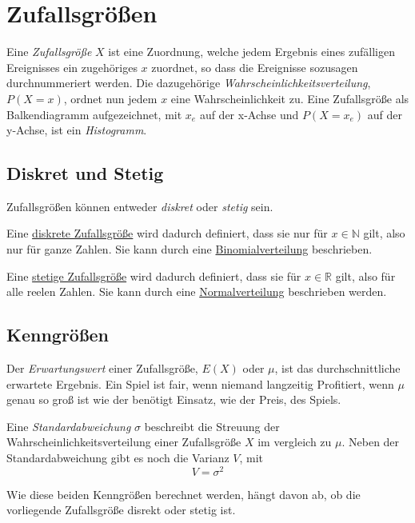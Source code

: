 \documentclass{article}
\begin{document}
\section{Zufallsgrößen} 
Eine \emph{Zufallsgröße} $X$ ist eine Zuordnung, welche jedem Ergebnis eines zufälligen Ereignisses ein zugehöriges $x$ zuordnet, so dass die Ereignisse sozusagen durchnummeriert werden. Die dazugehörige \emph{Wahrscheinlichkeitsverteilung}, $P(X=x)$, ordnet nun jedem $x$ eine Wahrscheinlichkeit zu. \newline
Eine Zufallsgröße als Balkendiagramm aufgezeichnet, mit $x_e$ auf der x-Achse und $P(X=x_e)$ auf der y-Achse, ist ein \emph{Histogramm}.
 
\subsection{Diskret und Stetig} 
Zufallsgrößen können entweder \emph{diskret} oder \emph{stetig} sein.
 
Eine \hyperref[Diskrete Zufallsgröße]{diskrete Zufallsgröße} wird dadurch definiert, dass sie nur für $x \in \mathbb{N}$ gilt, also nur für ganze Zahlen. Sie kann durch eine \hyperref[Binomialverteilungen]{Binomialverteilung} beschrieben. 
 
Eine \hyperref[Stetige Zufallsgröße]{stetige Zufallsgröße} wird dadurch definiert, dass sie für $x \in \mathbb{R}$ gilt, also für alle reelen Zahlen. Sie kann durch eine \hyperref[Normalverteilungen]{Normalverteilung} beschrieben werden.
 
\subsection{Kenngrößen}
Der \emph{Erwartungswert} einer Zufallsgröße, $E(X)$ oder $\mu$, ist das durchschnittliche erwartete Ergebnis. Ein Spiel ist fair, wenn niemand langzeitig Profitiert, wenn $\mu$ genau so groß ist wie der benötigt Einsatz, wie der Preis, des Spiels.
 
Eine \emph{Standardabweichung} $\sigma$ beschreibt die Streuung der Wahrscheinlichkeitsverteilung einer Zufallsgröße $X$ im vergleich zu $\mu$.
Neben der Standardabweichung gibt es noch die Varianz $V$, mit
\[ 
 V = \sigma^2 
\]
 
Wie diese beiden Kenngrößen berechnet werden, hängt davon ab, ob die vorliegende Zufallsgröße disrekt oder stetig ist. 
\end{document}
